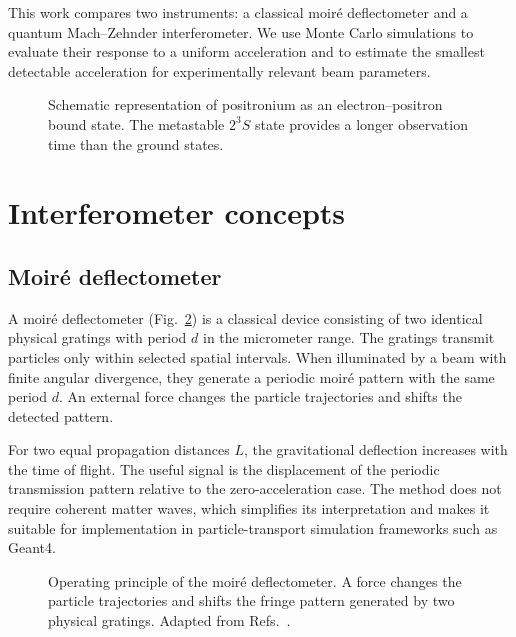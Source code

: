 \documentclass[10pt,twocolumn]{article}
\begin{document}
This work compares two instruments: a classical moir\'e deflectometer and a quantum Mach--Zehnder interferometer. We use Monte Carlo simulations to evaluate their response to a uniform acceleration and to estimate the smallest detectable acceleration for experimentally relevant beam parameters.

\begin{figure}[ht!]
  \centering
  \resizebox{0.5\linewidth}{!}{}
  \caption{Schematic representation of positronium as an electron--positron bound state. The metastable $2^3S$ state provides a longer observation time than the ground states.}
  \label{fig:positronium}
\end{figure}

\section{Interferometer concepts}

\subsection{Moir\'e deflectometer}

A moir\'e deflectometer (Fig.~\ref{fig:moire-principle}) is a classical device consisting of two identical physical gratings with period $d$ in the micrometer range. The gratings transmit particles only within selected spatial intervals. When illuminated by a beam with finite angular divergence, they generate a periodic moir\'e pattern with the same period $d$. An external force changes the particle trajectories and shifts the detected pattern.

For two equal propagation distances $L$, the gravitational deflection increases with the time of flight. The useful signal is the displacement of the periodic transmission pattern relative to the zero-acceleration case. The method does not require coherent matter waves, which simplifies its interpretation and makes it suitable for implementation in particle-transport simulation frameworks such as Geant4.

\begin{figure}[ht!]
  \centering
  \resizebox{\linewidth}{!}{}
  \caption{Operating principle of the moir\'e deflectometer. A force changes the particle trajectories and shifts the fringe pattern generated by two physical gratings. Adapted from Refs.~\cite{Mariazzi_Caravita_Doser_Nebbia_Brusa_2020,Oberthaler_Bernet_Rasel_Schmiedmayer_Zeilinger_1996}.}
  \label{fig:moire-principle}
\end{figure}
\end{document}
